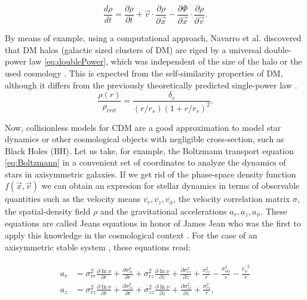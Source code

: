 \begin{equation}
\frac{d\rho}{dt} = \frac{\partial \rho}{\partial t} +\vec{v}\cdot\frac{\partial\rho}{\partial \vec{x}}
-\frac{\partial \Phi}{\partial \vec{x}}\cdot\frac{\partial\rho}{\partial \vec{v}}.
\label{eq:Boltzmann}
\end{equation}

   
By means of example, using a computational approach, Navarro et al. discovered that DM halos (galactic sized clusters of DM) are riged by a universal double-power law \eqref{eq:doublePower}, which was independent of the size of the halo or the used cosmology \cite{Navarro_et_al._1996,Navarro_et_al._1997,Power_et_al._2003,Navarro_et_al._2010}. This is expected from the self-similarity properties of DM, although it differs from the previously theoretically predicted single-power law  \cite{Gunn_and_Gott_1972,White_and_Zaritsky_1992}.\\

\begin{equation}
\frac{\rho(r)}{\rho_{crit}} = \frac{\delta_c}{(r/r_s)(1+r/r_s)^2}.
\label{eq:doublePower}
\end{equation}

Now, collisionless models for CDM are a good approximation to model star dynamics or other cosmological objects with negligible cross-section, such as Black Holes (BH). Let us take, for example, the Boltzmann transport equation \eqref{eq:Boltzmann} in a convenient set of coordinates to analyze the dynamics of stars in axisymmetric galaxies. If we get rid of the phase-space density function $f(\vec{x},\vec{v})$ we can obtain an expresion for stellar dynamics in terms of observable quantities such as the velocity means $\overline{v_r},\overline{v_z},\overline{v_\phi}$, the velocity correlation matrix $\sigma$, the spatial-density field $\rho$ and the gravitational accelerations $a_r,a_z,a_\phi$. These equations are called Jeans equations in honor of James Jean who was the first to apply this knowledge in the cosmological context \cite{Jeans_1915}. For the case of an axisymmetric stable system \cite{Loebman_et_al._2012}, these equations read:  

\begin{align}
\begin{aligned}
a_r & = \sigma^2_{rr} \frac{\partial \ln \nu}{\partial r} + \frac{\partial \sigma^2_{rr} }{\partial r} + \sigma^2_{rz} \frac{\partial \ln \nu}{\partial z} + \frac{\partial \sigma^2_{rz} }{\partial z} +  \frac{\sigma^2_{rr}}{r}-\frac{\sigma^2_{\phi\phi}}{r}-\frac{\overline{v_\phi}^2}{r}\\
a_z & =  \sigma^2_{rz} \frac{\partial \ln \nu}{\partial r} + \frac{\partial \sigma^2_{rz} }{\partial r} + \sigma^2_{zz}\frac{\partial \ln \nu}{\partial z} + \frac{\partial \sigma^2_{zz} }{\partial z} +  \frac{\sigma^2_{rz}}{r},
\end{aligned}
\label{eq:Jeans}
\end{align}

